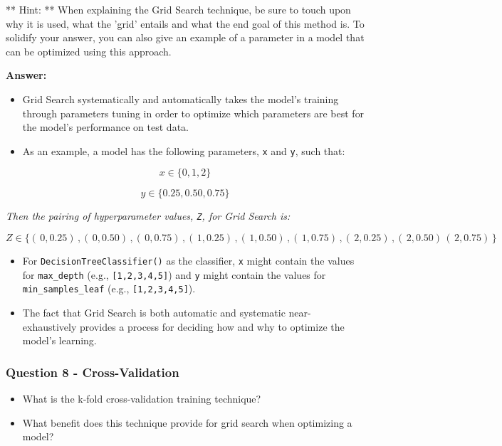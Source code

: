\documentclass[11pt]{article}
\providecommand{\tightlist}{%
      \setlength{\itemsep}{0pt}\setlength{\parskip}{0pt}}
\begin{document}
** Hint: ** When explaining the Grid Search technique, be sure to touch
upon why it is used, what the 'grid' entails and what the end goal of
this method is. To solidify your answer, you can also give an example of
a parameter in a model that can be optimized using this approach.

    \textbf{Answer: }

\begin{itemize}
\tightlist
\item
  Grid Search systematically and automatically takes the model's
  training through parameters tuning in order to optimize which
  parameters are best for the model's performance on test data.
\item
  As an example, a model has the following parameters, \texttt{x} and
  \texttt{y}, such that:
\end{itemize}

\[x \in \{0, 1, 2\}\]

\[y \in \{0.25, 0.50, 0.75\}\]

\emph{Then the pairing of hyperparameter values, \texttt{Z}, for Grid
Search is:}

\[Z \in \{( \, 0, 0.25) \,,( \, 0, 0.50) \,,( \, 0, 0.75) \,,( \, 1, 0.25) \,,( \, 1, 0.50) \,,( \, 1, 0.75) \,,( \, 2, 0.25) \,,( \, 2, 0.50) \,( \, 2, 0.75) \,\}\]

\begin{itemize}
\tightlist
\item
  For \texttt{DecisionTreeClassifier()} as the classifier, \texttt{x}
  might contain the values for \texttt{max\_depth} (e.g.,
  \texttt{{[}1,2,3,4,5{]}}) and \texttt{y} might contain the values for
  \texttt{min\_samples\_leaf} (e.g., \texttt{{[}1,2,3,4,5{]}}).
\item
  The fact that Grid Search is both automatic and systematic
  near-exhaustively provides a process for deciding how and why to
  optimize the model's learning.
\end{itemize}

    \subsubsection{Question 8 -
Cross-Validation}\label{question-8---cross-validation}

\begin{itemize}
\item
  What is the k-fold cross-validation training technique?
\item
  What benefit does this technique provide for grid search when
  optimizing a model?
\end{itemize}
\end{document}
